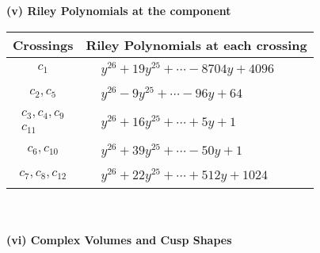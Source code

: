 \documentclass[1p]{elsarticle_modified}
\theoremstyle{definition}
\begin{document}
\newpage\renewcommand{\arraystretch}{1}
\flushleft \textbf{(v) Riley Polynomials at the component}\newline \\
\begin{tabular}{m{50pt}|m{274pt}}
Crossings & \hspace{64pt}Riley Polynomials at each crossing \\
\hline $$\begin{aligned}c_{1}\end{aligned}$$&$\begin{aligned}
&y^{26}+19 y^{25}+\cdots-8704 y+4096
\end{aligned}$\\
\hline $$\begin{aligned}c_{2},c_{5}\end{aligned}$$&$\begin{aligned}
&y^{26}-9 y^{25}+\cdots-96 y+64
\end{aligned}$\\
\hline $$\begin{aligned}c_{3},c_{4},c_{9}\\c_{11}\end{aligned}$$&$\begin{aligned}
&y^{26}+16 y^{25}+\cdots+5 y+1
\end{aligned}$\\
\hline $$\begin{aligned}c_{6},c_{10}\end{aligned}$$&$\begin{aligned}
&y^{26}+39 y^{25}+\cdots-50 y+1
\end{aligned}$\\
\hline $$\begin{aligned}c_{7},c_{8},c_{12}\end{aligned}$$&$\begin{aligned}
&y^{26}+22 y^{25}+\cdots+512 y+1024
\end{aligned}$\\
\hline
\end{tabular}\\~\\
\newpage\flushleft \textbf{(vi) Complex Volumes and Cusp Shapes}
\end{document}
